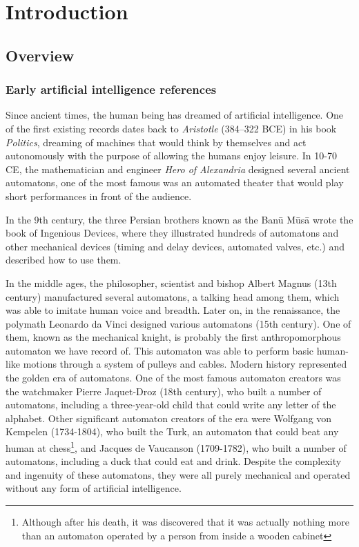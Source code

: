 \chapter{Introduction} \label{ch:introduction}
\section{Overview}
\subsection{Early artificial intelligence references}
Since ancient times, the human being has dreamed of artificial intelligence. One of the first existing records dates back to \textit{Aristotle} (384–322 BCE) in his book \textit{Politics}, dreaming of machines that would think by themselves and act autonomously with the purpose of allowing the humans enjoy leisure. In 10-70 CE, the mathematician and engineer \textit{Hero of Alexandria} designed several ancient automatons, one of the most famous was an automated theater that would play short performances in front of the audience.

In the 9th century, the three Persian brothers known as the Banū Mūsā wrote the book of Ingenious Devices, where they illustrated hundreds of automatons and other mechanical devices (timing and delay devices, automated valves, etc.) and described how to use them.

In the middle ages, the philosopher, scientist and bishop Albert Magnus (13th century) manufactured several automatons, a talking head among them, which was able to imitate human voice and breadth. Later on, in the renaissance, the polymath Leonardo da Vinci designed various automatons (15th century). One of them, known as the mechanical knight, is probably the first anthropomorphous automaton we have record of. This automaton was able to perform basic human-like motions through a system of pulleys and cables. Modern history represented the golden era of automatons. One of the most famous automaton creators was the watchmaker Pierre Jaquet-Droz (18th century), who built a number of automatons, including a three-year-old child that could write any letter of the alphabet. Other significant automaton creators of the era were Wolfgang von Kempelen (1734-1804), who built the Turk, an automaton that could beat any human at chess\footnote{Although after his death, it was discovered that it was actually nothing more than an automaton operated by a person from inside a wooden cabinet }, and Jacques de Vaucanson (1709-1782), who built a number of automatons, including a duck that could eat and drink. Despite the complexity and ingenuity of these automatons, they were all purely mechanical and operated without any form of artificial intelligence.

